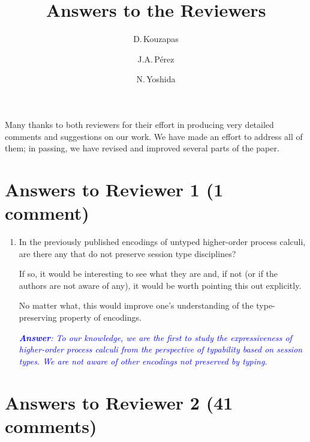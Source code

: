 \documentclass[11pt,a4paper]{article}
\newcommand{\answ}[1]{\smallskip \emph{\textcolor{blue}{\textbf{Answer}:  #1}}}
\begin{document}
 
 \title{Answers to the Reviewers}
 \author{D.\,Kouzapas \and J.A.\,P\'{e}rez \and N.\,Yoshida}
 \maketitle

\noindent
Many thanks to both reviewers for their effort in producing very detailed comments and suggestions on our work.
We have made an effort to address all of them; in passing, we have revised and improved several parts of the paper.
 
\section{Answers to Reviewer 1 (1 comment)}


\begin{enumerate}
    \item  In the previously published encodings of untyped higher-order process calculi, are there any that do not preserve session type disciplines? 
    
    If so, it would be interesting to see what they are and, if not (or if the authors are not aware of any), it would be worth pointing this out explicitly. 
    
    No matter what, this would improve one’s understanding of the type-preserving property of encodings.
    
    \answ{To our knowledge, we are the first to study the expressiveness of higher-order process calculi from the perspective of typability based on session types. We are not aware of other encodings not preserved by typing.}
\end{enumerate}



\section{Answers to Reviewer 2 (41 comments) }
\end{document}
